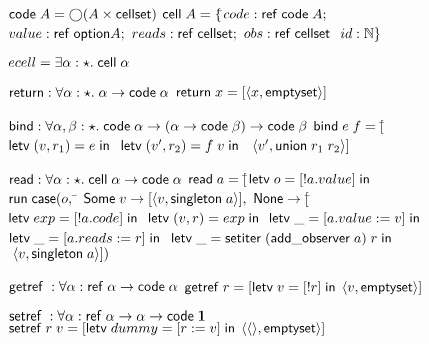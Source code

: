 \begin{figure}
\mbox{}
\begin{specification}
\nextline $\mathsf{code}\;{A} = \bigcirc{(A \times \mathsf{cellset})}$ \nextline[1em]
$\mathsf{cell}\;{A} = \{$\=$code: \mathsf{ref}\;\mathsf{code}\;{A};$ \nextline
                   \>$value: \mathsf{ref}\;\mathsf{option }{A};$ \nextline
                   \>$reads: \mathsf{ref}\;\mathsf{cellset};$ \nextline
                   \>$obs:   \mathsf{ref}\;\mathsf{cellset}\;$ \nextline
                   \>$id:    \mathbb{N}\}$ \nextline[1em]

$ecell = \exists \alpha:\star.\; \mathsf{cell}\;{\alpha}$ \nextline[1em]

$\mathsf{return} : \forall \alpha:\star.\; \alpha \to \mathsf{code}\;{\alpha}$ \nextline
$\mathsf{return}\;x = [\left<{x},{\mathsf{emptyset}}\right>]$ \nextline[1em]

$\mathsf{bind} : \forall \alpha,\beta:\star.\; \mathsf{code}\;{\alpha} \to (\alpha \to \mathsf{code}\;{\beta}) \to \mathsf{code}\;{\beta}$ \nextline
$\mathsf{bind}\;e\;f = [$\=$\mathsf{letv}\;(v,r_1) = e\;\mathsf{in}\;$ \nextline
                        \>$\mathsf{letv}\;(v',r_2) = f\;v\;\mathsf{in}\;$ \nextline
                        \>$\;\left<{v'},{\mathsf{union}\;r_1\;r_2}\right>]$\nextline[1em]

$\mathsf{read} : \forall \alpha:\star.\; \mathsf{cell}\;{\alpha} \to \mathsf{code}\;{\alpha}$ \nextline
$\mathsf{read}\;a = [$\=$\mathsf{letv}\;o = [!a.value]\;\mathsf{in}\;$ \nextline
                     \>$\mathsf{run}\;\mathsf{case}(o,$ \nextline
                     \>\qquad\= $\mathsf{Some}\;v \to [\left<{v},{\mathsf{singleton}\;a}\right>],$ \nextline
                     \>      \> $\mathsf{None} \to [$\=$\mathsf{letv}\;exp = [!a.code]\;\mathsf{in}\;$ \nextline
                     \>      \>                     \>$\mathsf{letv}\;(v,r) = exp\;\mathsf{in}\;$ \nextline
                     \>      \>                     \>$\mathsf{letv}\;\_ = [a.value := v]\;\mathsf{in}\;$\nextline
                     \>      \>                     \>$\mathsf{letv}\;\_ = [a.reads := r]\;\mathsf{in}\;$ \nextline
                     \>      \>                     \>$\mathsf{letv}\;\_ = \mathsf{setiter}\;(\mathsf{add\_observer}\;a)\;r\;\mathsf{in}\;$ \nextline
                     \>      \>                     \>$\;\left<{v},{\mathsf{singleton}\;a}\right>])$ \nextline[1em]

$\mathsf{getref}\; : \forall \alpha : \mathsf{ref}\;\alpha \to \mathsf{code}\;{\alpha}$ \nextline
$\mathsf{getref}\; r = [\mathsf{letv}\;v = [!r]\;\mathsf{in}\;\left<{v},{\mathsf{emptyset}}\right>]$ \nextline[1em]

$\mathsf{setref}\; : \forall \alpha : \mathsf{ref}\;\alpha \to \alpha \to \mathsf{code}\;{\mathbf{1}}$ \nextline
$\mathsf{setref}\; r\;v = [\mathsf{letv}\;dummy = [r := v]\;\mathsf{in}\;\left<{\left<\right>},{\mathsf{emptyset}}\right>]$ \nextline[1em]


\end{specification}
\end{figure}

